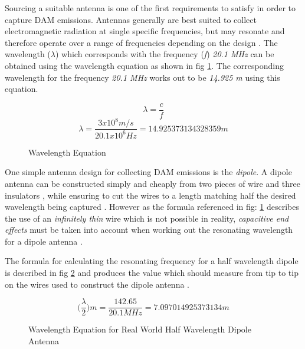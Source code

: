 \documentclass[runningheads,a4paper]{llncs}
\begin{document}
Sourcing a suitable antenna is one of the first requirements to satisfy in order to capture \gls{DAM} emissions. Antennas generally are best suited to collect electromagnetic radiation at single specific frequencies, but may resonate and therefore operate over a range of frequencies depending on the design \citep{nasa12}. The wavelength ($\lambda$) which corresponds with the frequency (\textit{f}) \textit{20.1 MHz} can be obtained using the wavelength equation as shown in fig \ref{fig:wavelength_equation}. The corresponding wavelength for the frequency \textit{20.1 MHz} works out to be \textit{14.925 m} using this equation.

%
\begin{figure}[here]
  \centering
  \begin{equation}  	
    \lambda = \frac{c}{f}
  \end{equation}
  \begin{equation}
    \lambda = \frac{3x10^8 m/s}{20.1x10^6 Hz} = 14.925373134328359 m
  \end{equation}
  \caption{Wavelength Equation}
  \label{fig:wavelength_equation}
\end{figure}
%

One simple antenna design for collecting \gls{DAM} emissions is the \textit{dipole}. A dipole antenna can be constructed simply and cheaply from two pieces of wire and three insulators \citep{nasa12}, while ensuring to cut the wires to a length matching half the desired wavelength being captured \citep{nasa12}. However as the formula referenced in fig: \ref{fig:wavelength_equation} describes the use of an \textit{infinitely thin} wire which is not possible in reality, \textit{capacitive end effects} must be taken into account when working out the resonating wavelength for a dipole antenna \citep{nasa12}.

The formula for calculating the resonating frequency for a half wavelength dipole is described in fig \ref{fig:wavelength_equation_dipole} and produces the value which should measure from tip to tip on the wires used to construct the dipole antenna \citep{nasa12}.

%
\begin{figure}[here]
  \centering
  \begin{equation}  	
    \bigg(\frac{\lambda}{2}\bigg)m = \frac{142.65}{20.1 MHz} = 7.097014925373134 m
  \end{equation}
  \caption{Wavelength Equation for Real World Half Wavelength Dipole Antenna}
  \label{fig:wavelength_equation_dipole}
\end{figure}
%
\end{document}
